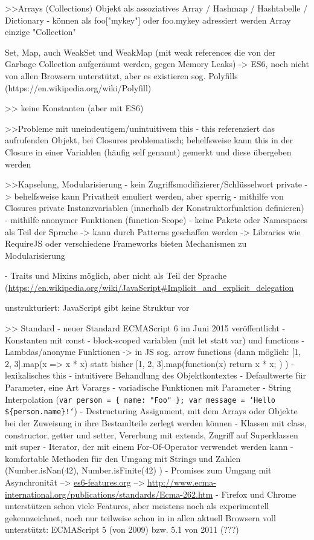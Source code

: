 \documentclass[a4paper, 12pt, hidelinks, listof=totoc, listoftables=totoc, bibliography=totoc]{scrreprt}
\begin{document}
>>Arrays (Collections)
Objekt als assoziatives Array / Hashmap / Hashtabelle / Dictionary
- können als foo["mykey"] oder foo.mykey adressiert werden
Array einzige "Collection"

Set, Map, auch WeakSet und WeakMap (mit weak references die von der Garbage Collection aufgeräumt werden, gegen Memory Leaks) -> ES6, noch nicht von allen Browsern unterstützt, aber es existieren sog. Polyfills (https://en.wikipedia.org/wiki/Polyfill)

>> keine Konstanten (aber mit ES6)

>>Probleme mit uneindeutigem/unintuitivem this
- this referenziert das aufrufenden Objekt, bei Closures problematisch; behelfsweise kann this in der Closure in einer Variablen (häufig self genannt) gemerkt und diese übergeben werden

>>Kapselung, Modularisierung
- kein Zugriffsmodifizierer/Schlüsselwort private
-> behelfsweise kann Privatheit emuliert werden, aber sperrig
	- mithilfe von Closures private Instanzvariablen (innerhalb der Konstruktorfunktion definieren)
	- mithilfe anonymer Funktionen (function-Scope)
- keine Pakete oder Namespaces als Teil der Sprache
-> kann durch Patterns geschaffen werden
-> Libraries wie RequireJS oder verschiedene Frameworks bieten Mechanismen zu Modularisierung

- Traits und Mixins möglich, aber nicht als Teil der Sprache (\url{https://en.wikipedia.org/wiki/JavaScript#Implicit_and_explicit_delegation}

unstrukturiert: JavaScript gibt keine Struktur vor


>> Standard
- neuer Standard ECMAScript 6 im Juni 2015 veröffentlicht
	- Konstanten mit const
	- block-scoped variablen (mit let statt var) und functions
	- Lambdas/anonyme Funktionen -> in JS sog. arrow functions (dann möglich: [1, 2, 3].map(x => x * x) statt bisher [1, 2, 3].map(function(x) { return x * x; }) )
	- lexikalisches this - intuitivere Behandlung des Objektkontextes
	- Defaultwerte für Parameter, eine Art Varargs
	- variadische Funktionen mit Parameter
	- String Interpolation (\texttt{var person = \{ name: "Foo" \}; var message = `Hello \$\{person.name\}!`})
	- Destructuring Assignment, mit dem Arrays oder Objekte bei der Zuweisung in ihre Bestandteile zerlegt werden können
	- Klassen mit class, constructor, getter und setter, Vererbung mit extends, Zugriff auf Superklassen mit super
	- Iterator, der mit einem For-Of-Operator verwendet werden kann
	- komfortable Methoden für den Umgang mit Strings und Zahlen (Number.isNan(42), Number.isFinite(42) )
	- Promises zum Umgang mit Asynchronität
	-->  \url{es6-features.org}
	-->  \url{http://www.ecma-international.org/publications/standards/Ecma-262.htm}
- Firefox und Chrome unterstützen schon viele Features, aber meistens noch als experimentell gekennzeichnet, noch nur teilweise schon in
in allen aktuell Browsern voll unterstützt: ECMAScript 5 (von 2009) bzw. 5.1 von 2011 (???)
\end{document}
